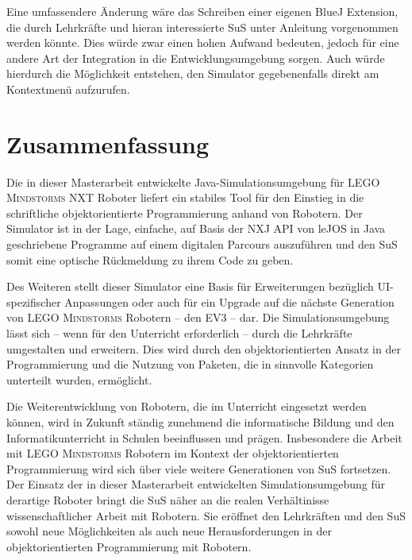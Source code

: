 \documentclass[paper=a4, DIV=calc, BCOR=12mm, twoside=on, onecolumn=on, open = right, titlepage =on, parskip =half-, headsepline = on, footsepline = off, chapterprefix = off, appendixprefix = on, fontsize = 12pt, numbers = noenddot, abstract = on]{scrbook}
\begin{document}
Eine umfassendere Änderung wäre das Schreiben einer eigenen BlueJ Extension, die durch Lehrkräfte und hieran interessierte SuS unter Anleitung vorgenommen werden könnte. Dies würde zwar einen hohen Aufwand bedeuten, jedoch für eine andere Art der Integration in die Entwicklungsumgebung sorgen. Auch würde hierdurch die Möglichkeit entstehen, den Simulator gegebenenfalls direkt am Kontextmenü aufzurufen.

\section{Zusammenfassung}

Die in dieser Masterarbeit entwickelte Java-Simulations\-um\-ge\-bung für \textsc{LEGO Mindstorms} NXT Roboter liefert ein stabiles Tool für den Einstieg in die schriftliche objektorientierte Programmierung anhand von Robotern. Der Simulator ist in der Lage, einfache, auf Basis der NXJ API von leJOS in Java geschriebene Programme auf einem digitalen Parcours auszuführen und den SuS somit eine optische Rückmeldung zu ihrem Code zu geben.

Des Weiteren stellt dieser Simulator eine Basis für Erweiterungen bezüglich UI-spezifischer Anpassungen oder auch für ein Upgrade auf die nächste Generation von \textsc{LEGO Mindstorms} Robotern -- den EV3 -- dar. Die Simulationsumgebung lässt sich -- wenn für den Unterricht erforderlich -- durch die Lehrkräfte umgestalten und erweitern. Dies wird durch den objektorientierten Ansatz in der Programmierung und die Nutzung von Paketen, die in sinnvolle Kategorien unterteilt wurden, ermöglicht.

Die Weiterentwicklung von Robotern, die im Unterricht eingesetzt werden können, wird in Zukunft ständig zunehmend die informatische Bildung und den Informatikunterricht in Schulen beeinflussen und prägen. Insbesondere die Arbeit mit \textsc{LEGO Mindstorms} Robotern im Kontext der objektorientierten Programmierung wird sich über viele weitere Generationen von SuS fortsetzen. Der Einsatz der in dieser Masterarbeit entwickelten Simulationsumgebung für derartige Roboter bringt die SuS näher an die realen Verhältinisse wissenschaftlicher Arbeit mit Robotern. Sie eröffnet den Lehrkräften und den SuS sowohl neue Möglichkeiten als auch neue Herausforderungen in der objektorientierten Programmierung mit Robotern.

\newpage

\newpage

\end{document}
